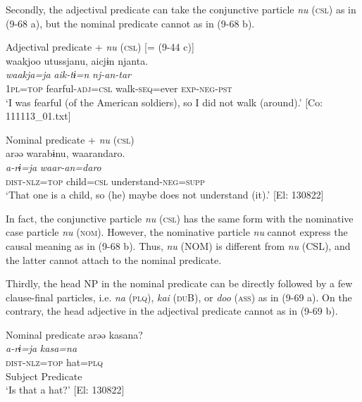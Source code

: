 Secondly, the adjectival predicate can take the conjunctive particle \textit{nu} (\textsc{csl}) as in (9-68 a), but the nominal predicate cannot as in (9-68 b).

\ea   \label{ex:9.68}
\ea Adjectival predicate + \textit{nu} (\textsc{csl}) [= (9-44 c)]\\
 \glll  waakjoo  utussjanu,  aicjɨn  njanta.\\
    \textit{waakja=ja}  \textit{}  \textit{aik-tɨ=n}  \textit{nj-an-tar}\\
    1\textsc{pl}=\textsc{top}  fearful-\textsc{adj}=\textsc{csl}  walk-\textsc{seq}=ever  \textsc{exp}-\textsc{neg}-\textsc{pst}\\
    \glt     ‘I was fearful (of the American soldiers), so I did not walk (around).’ [Co: 111113\_01.txt]

\ex Nominal predicate + \textit{nu} (\textsc{csl})\\
 \glll  *arəə  warabɨnu,  waarandaro.\\
    \textit{a-rɨ=ja}  \textit{}  \textit{waar-an=daro}\\
    \textsc{dist}-\textsc{nlz}=\textsc{top}  child=\textsc{csl}  understand-\textsc{neg}=\textsc{supp}\\
     ‘That one is a child, so (he) maybe does not understand (it).’ [El: 130822]
    \z
\z

In fact, the conjunctive particle \textit{nu} (\textsc{csl}) has the same form with the nominative case particle \textit{nu} (\textsc{nom}). However, the nominative particle \textit{nu} cannot express the causal meaning as in (9-68 b). Thus, \textit{nu} (NOM) is different from \textit{nu} (CSL), and the latter cannot attach to the nominal predicate.

Thirdly, the head NP in the nominal predicate can be directly followed by a few clause-final particles, i.e. \textit{na} (\textsc{plq}), \textit{kai} (\textsc{du}B), or \textit{doo} (\textsc{ass}) as in (9-69 a). On the contrary, the head adjective in the adjectival predicate cannot as in (9-69 b).

\ea \label{ex:9.69}
\exi{} Nominal predicate 
\ea %
 \gllll  arəə  kasana?\\
      \textit{a-rɨ=ja}  \textit{kasa=na}\\
      \textsc{dist}-\textsc{nlz}=\textsc{top}  hat=\textsc{plq}\\
      Subject  Predicate\\
      \glt       ‘Is that a hat?’ [El: 130822]


